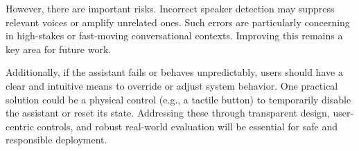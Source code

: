 However, there are important risks. Incorrect speaker detection may suppress relevant voices or amplify unrelated ones. Such errors are particularly concerning in high-stakes or fast-moving conversational contexts. Improving this remains a key area for future work.

Additionally, if the assistant fails or behaves unpredictably, users should have a clear and intuitive means to override or adjust system behavior. One practical solution could be a physical control (e.g., a tactile button) to temporarily disable the assistant or reset its state. Addressing these through transparent design, user-centric controls, and robust real-world evaluation will be essential for safe and responsible deployment.


